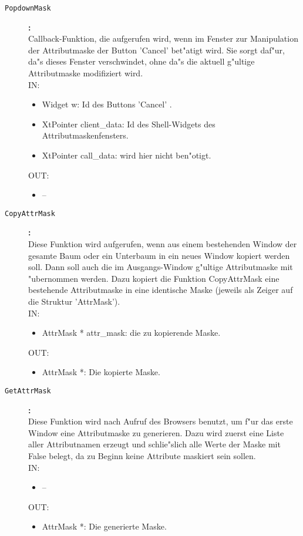 \begin{description}
\item[\tt PopdownMask]{\bf :\\}
Callback-Funktion, die aufgerufen wird, wenn im Fenster zur Manipulation der Attributmaske der Button 'Cancel' bet"atigt wird. Sie sorgt daf"ur, da"s dieses Fenster verschwindet, ohne da"s die aktuell g"ultige Attributmaske modifiziert wird. \\
IN:
\begin{itemize}
   \item Widget w:      Id des Buttons 'Cancel' . \item XtPointer client\_data: Id des Shell-Widgets des Attributmaskenfensters. \item XtPointer call\_data:   wird hier nicht ben"otigt.
\end{itemize}
OUT:
\begin{itemize}
   \item --
\end{itemize}

\item[\tt CopyAttrMask]{\bf :\\}
Diese Funktion wird aufgerufen, wenn aus einem bestehenden Window der gesamte Baum oder ein Unterbaum in ein neues Window kopiert werden soll. Dann soll auch die im Ausgangs-Window g"ultige Attributmaske mit "ubernommen werden. Dazu kopiert die Funktion CopyAttrMask eine bestehende Attributmaske in eine identische Maske (jeweils als Zeiger auf die Struktur 'AttrMask'). \\
IN:
\begin{itemize}
   \item AttrMask * attr\_mask: die zu kopierende Maske.
\end{itemize}
OUT:
\begin{itemize}
   \item AttrMask *: Die kopierte Maske.
\end{itemize}

\item[\tt GetAttrMask]{\bf :\\}
Diese Funktion wird nach Aufruf des Browsers benutzt, um f"ur das erste Window eine Attributmaske zu generieren. Dazu wird zuerst eine Liste aller Attributnamen erzeugt und schlie"slich alle Werte der Maske mit False belegt, da zu Beginn keine Attribute maskiert sein sollen. \\
IN:
\begin{itemize}
   \item --
\end{itemize}
OUT:
\begin{itemize}
   \item AttrMask *: Die generierte Maske.
\end{itemize}


\end{description}
